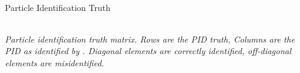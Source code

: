 \begin{frame}{Particle Identification Truth}
\begin{center}
\begin{tabularx}{230pt}{Xllllll}
        \end{tabularx}
    \end{center}
    \scriptsize{\textit{
        Particle identification truth matrix.
        Rows are the PID truth, Columns are the PID as identified by .
        Diagonal elements are correctly identified, off-diagonal elements are misidentified.
    }}

\end{frame}

